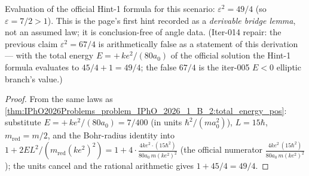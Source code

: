 \begin{theorem}
\label{thm:IPhO2026Problems_problem_IPhO_2026_1_B_2:eccentricity_sq_eq}
Evaluation of the official Hint-1 formula for this scenario:
$\varepsilon^2 = 49/4$ (so $\varepsilon = 7/2 > 1$).  This is the
page's first hint recorded as a \emph{derivable bridge lemma}, not an
assumed law; it is conclusion-free of angle data.  (Iter-014 repair: the
previous claim $\varepsilon^2 = 67/4$ is arithmetically false as a
statement of this derivation --- with the total energy
$E = +\,k e^2/(80 a_0)$ of the official solution the Hint-1 formula
evaluates to $45/4 + 1 = 49/4$; the false $67/4$ is the iter-005 $E < 0$
elliptic branch's value.)
\end{theorem}
\begin{proof}
From the same laws as
\cref{thm:IPhO2026Problems_problem_IPhO_2026_1_B_2:total_energy_pos}:
substitute $E = +\,k e^2/(80 a_0) = 7/400$ (in units
$\hbar^2/(m a_0^2)$), $L = 15\hbar$, $m_{\mathrm{red}} = m/2$, and the
Bohr-radius identity into $1 + 2 E L^2/(m_{\mathrm{red}}(k e^2)^2) =
1 + 4 \cdot \tfrac{4 k e^2 \cdot (15\hbar^2)}{80 a_0\, m (k e^2)^2}$
(the official numerator $\tfrac{4 k e^2\,(15\hbar^2)}{80 a_0\,m(ke^2)^2}$);
the units cancel and the rational arithmetic gives
$1 + 45/4 = 49/4$.
\end{proof}


